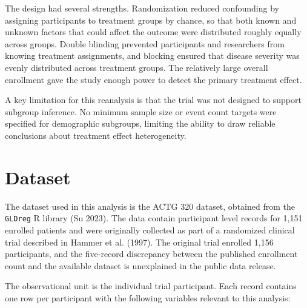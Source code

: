 \documentclass[
  letterpaper,
  DIV=11,
  numbers=noendperiod]{scrartcl}
\begin{document}
The design had several strengths. Randomization reduced confounding by
assigning participants to treatment groups by chance, so that both known
and unknown factors that could affect the outcome were distributed
roughly equally across groups. Double blinding prevented participants
and researchers from knowing treatment assignments, and blocking ensured
that disease severity was evenly distributed across treatment groups.
The relatively large overall enrollment gave the study enough power to
detect the primary treatment effect.

A key limitation for this reanalysis is that the trial was not designed
to support subgroup inference. No minimum sample size or event count
targets were specified for demographic subgroups, limiting the ability
to draw reliable conclusions about treatment effect heterogeneity.

\section{Dataset}\label{sec-data}

The dataset used in this analysis is the ACTG 320 dataset, obtained from
the \texttt{GLDreg} R library (Su 2023). The data contain participant
level records for 1,151 enrolled patients and were originally collected
as part of a randomized clinical trial described in Hammer et al.
(1997). The original trial enrolled 1,156 participants, and the
five-record discrepancy between the published enrollment count and the
available dataset is unexplained in the public data release.

The observational unit is the individual trial participant. Each record
contains one row per participant with the following variables relevant
to this analysis:
\end{document}
